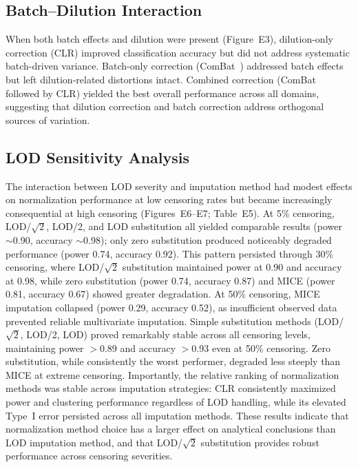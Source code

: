 \documentclass[12pt]{article}
\begin{document}
\subsection{Batch--Dilution Interaction}

When both batch effects and dilution were present (Figure~E3), dilution-only correction (CLR) improved classification accuracy but did not address systematic batch-driven variance. Batch-only correction (ComBat~\cite{Johnson2007}) addressed batch effects but left dilution-related distortions intact. Combined correction (ComBat followed by CLR) yielded the best overall performance across all domains, suggesting that dilution correction and batch correction address orthogonal sources of variation.

\subsection{LOD Sensitivity Analysis}

The interaction between LOD severity and imputation method had modest effects on normalization performance at low censoring rates but became increasingly consequential at high censoring (Figures~E6--E7; Table~E5). At 5\% censoring, LOD/$\sqrt{2}$, LOD/2, and LOD substitution all yielded comparable results (power $\sim$0.90, accuracy $\sim$0.98); only zero substitution produced noticeably degraded performance (power 0.74, accuracy 0.92). This pattern persisted through 30\% censoring, where LOD/$\sqrt{2}$ substitution maintained power at 0.90 and accuracy at 0.98, while zero substitution (power 0.74, accuracy 0.87) and MICE (power 0.81, accuracy 0.67) showed greater degradation. At 50\% censoring, MICE imputation collapsed (power 0.29, accuracy 0.52), as insufficient observed data prevented reliable multivariate imputation. Simple substitution methods (LOD/$\sqrt{2}$, LOD/2, LOD) proved remarkably stable across all censoring levels, maintaining power $>$0.89 and accuracy $>$0.93 even at 50\% censoring. Zero substitution, while consistently the worst performer, degraded less steeply than MICE at extreme censoring. Importantly, the relative ranking of normalization methods was stable across imputation strategies: CLR consistently maximized power and clustering performance regardless of LOD handling, while its elevated Type~I error persisted across all imputation methods. These results indicate that normalization method choice has a larger effect on analytical conclusions than LOD imputation method, and that LOD/$\sqrt{2}$ substitution provides robust performance across censoring severities.
\end{document}
